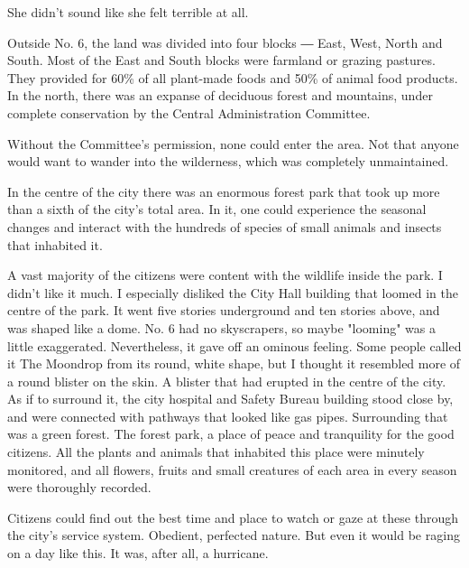 She didn't sound like she felt terrible at all.

Outside No. 6, the land was divided into four blocks ― East, West, North
and South. Most of the East and South blocks were farmland or grazing
pastures. They provided for 60\% of all plant-made foods and 50\% of
animal food products. In the north, there was an expanse of deciduous
forest and mountains, under complete conservation by the Central
Administration Committee.

Without the Committee's permission, none could enter the area. Not that
anyone would want to wander into the wilderness, which was completely
unmaintained.

In the centre of the city there was an enormous forest park that took up
more than a sixth of the city's total area. In it, one could experience
the seasonal changes and interact with the hundreds of species of small
animals and insects that inhabited it.

A vast majority of the citizens were content with the wildlife inside
the park. I didn't like it much. I especially disliked the City Hall
building that loomed in the centre of the park. It went five stories
underground and ten stories above, and was shaped like a dome. No. 6 had
no skyscrapers, so maybe "looming" was a little exaggerated.
Nevertheless, it gave off an ominous feeling. Some people called it The
Moondrop from its round, white shape, but I thought it resembled more of
a round blister on the skin. A blister that had erupted in the centre of
the city. As if to surround it, the city hospital and Safety Bureau
building stood close by, and were connected with pathways that looked
like gas pipes. Surrounding that was a green forest. The forest park, a
place of peace and tranquility for the good citizens. All the plants and
animals that inhabited this place were minutely monitored, and all
flowers, fruits and small creatures of each area in every season were
thoroughly recorded.

Citizens could find out the best time and place to watch or gaze at
these through the city's service system. Obedient, perfected nature. But
even it would be raging on a day like this. It was, after all, a
hurricane.

